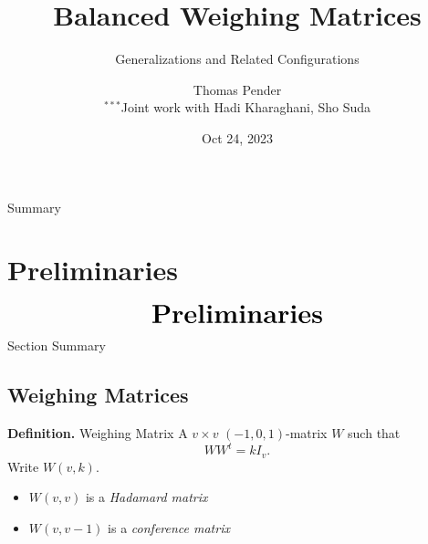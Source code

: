 \documentclass{beamer}
\title[Balanced Weighing Matrices]{Balanced Weighing Matrices}
\subtitle{Generalizations and Related Configurations}
\author[T. Pender]{Thomas Pender\\\scriptsize $^{***}$Joint work with Hadi Kharaghani, Sho Suda}
\institute[SFU]{Department of Mathematics\\Simon Fraser University}
\date[10/10/2023]{Oct 24, 2023}
\begin{document}
{
\begin{frame}
  \titlepage
\end{frame}
}

\begin{frame}{Summary}
  \tableofcontents[hideallsubsections,sections={1-5}]
\end{frame}


\section{Preliminaries}

\begin{frame}
  \[
    \text{\huge\bf Preliminaries}
  \]
\end{frame}

\begin{frame}{Section Summary}
  \tableofcontents[sections={1}]
\end{frame}


\subsection{Weighing Matrices}

\begin{frame}

  \begin{block}{{\bf Definition.} Weighing Matrix}
    A $v \times v$ $(-1,0,1)$-matrix $W$ such that
    \[
      WW^t = kI_v.
    \]
    Write $W(v,k)$.
  \end{block}

  \begin{itemize}
  \item $W(v,v)$ is a {\it Hadamard matrix}
  \item $W(v,v-1)$ is a {\it conference matrix}
  \end{itemize}

\end{frame}
\end{document}
